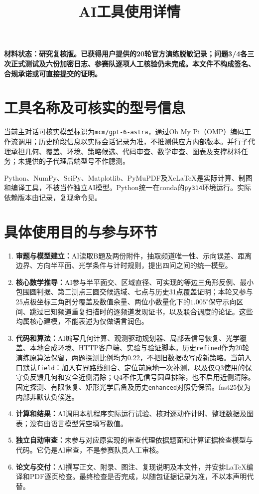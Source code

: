 \documentclass[UTF8,fontset=fandol,a4paper,zihao=-4]{ctexart}
\title{AI工具使用详情}
\author{}\date{}
\begin{document}
\maketitle
\noindent\textbf{材料状态：研究复核版。已获得用户提供的20轮官方演练脱敏记录；问题3/4各三次正式测试及六份加密日志、参赛队逐项人工核验仍未完成。本文件不构成签名、合规承诺或可直接提交的证明。}

\section{工具名称及可核实的型号信息}
当前主对话可核实模型标识为\texttt{mcm/gpt-6-astra}，通过Oh My Pi（OMP）编码工作流调用；历史阶段信息以实际会话记录为准，不推测供应方内部版本。并行子代理承担几何、覆盖、环境、策略候选、代码审查、数学审查、图表及支撑材料任务；未提供的子代理后端型号不作臆测。

Python、NumPy、SciPy、Matplotlib、PyMuPDF及XeLaTeX是实际计算、制图和编译工具，不被当作独立AI模型。Python统一在conda的\texttt{py314}环境运行。实际依赖版本由记录，复现命令见。

\section{具体使用目的与参与环节}
\begin{enumerate}
\item\textbf{审题与模型建立：}AI读取B题及两份附件，抽取频道唯一性、示向误差、距离边界、方向半平面、光学条件与计时规则，提出四问之间的统一模型。
\item\textbf{核心数学推导：}AI参与半平面交、区域直径、可实现的等边三角形反例、最小包围圆判据、第二测点三圆交候选域、七点与历史31点覆盖证明；本轮又参与25点极坐标三角剖分覆盖及数值余量、两位小数量化下的\(1.005^\circ\)保守示向区间、跳过已知频道重复扫描时的逐频道发现证书，以及联合调度的论证。这些均属核心建模，不能表述为仅做语言润色。
\item\textbf{代码和算法：}AI编写几何计算、观测驱动规划器、局部丢信号恢复、光学覆盖、本地合成环境、HTTP客户端、实验与验证脚本。历史\texttt{refined}作为20轮演练原算法保留，两题探测比例均为0.22，不把旧数据改写成新策略。当前入口默认\texttt{field}：加入有界路线组合、定位前原地一次补测，以及仅Q3使用的保守负反馈几何和安全近侧清除；Q4不作无信号圆盘排除，也不启用近侧清除。固定探测、有限恢复、矩形光学后备及历史\texttt{enhanced}对照仍保留。fast25仅为内部非默认负候选。
\item\textbf{计算和结果：}AI调用本机程序实际运行试验、核对逐动作计时、整理数据及图表；没有由语言模型凭空填写数值。
\item\textbf{独立自动审查：}未参与对应原实现的审查代理依据题面和计算证据检查模型与代码。它仍是AI审查，不是参赛队员人工审核。
\item\textbf{论文与交付：}AI撰写正文、附录、图注、复现说明及本文件，并安排LaTeX编译和PDF逐页检查。最终检查是否完成，以随包证据记录为准，不以本声明代替。
\end{enumerate}
\end{document}
